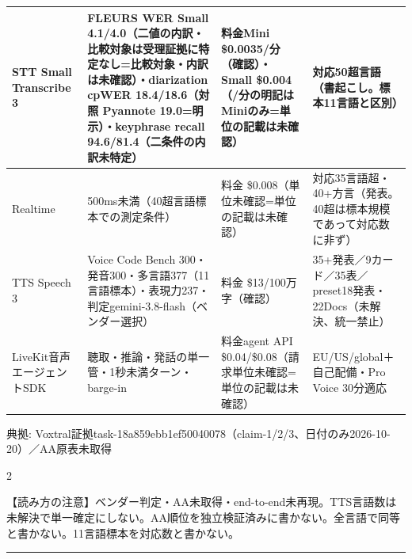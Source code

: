 \documentclass[lualatex,a4paper,10pt]{jlreq}
\begin{document}
{\centering\footnotesize
{}
\begin{tabularx}{0.96\linewidth}{@{}lXXX@{}}
\toprule
STT Small Transcribe 3 & FLEURS WER Small 4.1/4.0（二値の内訳・比較対象は受理証拠に特定なし=比較対象・内訳は未確認）・diarization cpWER 18.4/18.6（対照 Pyannote 19.0=明示）・keyphrase recall 94.6/81.4（二条件の内訳未特定） & 料金Mini \$0.0035/分（確認）・Small \$0.004（/分の明記はMiniのみ=単位の記載は未確認） & 対応50超言語（書起こし。標本11言語と区別） \\
\midrule
Realtime & 500ms未満（40超言語標本での測定条件） & 料金 \$0.008（単位未確認=単位の記載は未確認） & 対応35言語超・40+方言（発表。40超は標本規模であって対応数に非ず） \\
TTS Speech 3 & Voice Code Bench 300・発音300・多言語377（11言語標本）・表現力237・判定gemini-3.8-flash（ベンダー選択） & 料金 \$13/100万字（確認） & 35+発表／9カード／35表／preset18発表・22Docs（未解決、統一禁止） \\
LiveKit音声エージェントSDK & 聴取・推論・発話の単一管・1秒未満ターン・barge-in & 料金agent API \$0.04/\$0.08（請求単位未確認=単位の記載は未確認） & EU/US/global＋自己配備・Pro Voice 30分適応 \\
\bottomrule
\end{tabularx}
{\scriptsize\color{SurveyMuted} 典拠: Voxtral証拠task-18a859ebb1ef50040078（claim-1/2/3、日付のみ2026-10-20）／AA原表未取得\par}
} %
\begin{multicols}{2} %


\begin{tcolorbox}[colback=SurveySoft,colframe=SurveyRule,arc=1mm,boxrule=0.4pt,left=2mm,right=2mm]
【読み方の注意】ベンダー判定・AA未取得・end-to-end未再現。TTS言語数は未解決で単一確定にしない。AA順位を独立検証済みに書かない。全言語で同等と書かない。11言語標本を対応数と書かない。

\end{tcolorbox}


\end{multicols} %
\bigskip\hrule\bigskip %
\end{document}
